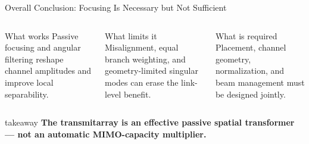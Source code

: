 \begin{frame}[t]{Overall Conclusion: Focusing Is Necessary but Not Sufficient}
\small
\begin{columns}[T,onlytextwidth]
  \begin{block}{What works}
    Passive focusing and angular filtering reshape channel amplitudes and
    improve local separability.
  \end{block}
  \begin{block}{What limits it}
    Misalignment, equal branch weighting, and geometry-limited singular modes
    can erase the link-level benefit.
  \end{block}
  \begin{block}{What is required}
    Placement, channel geometry, normalization, and beam management must be
    designed jointly.
  \end{block}
\end{columns}

\vspace{0.35cm}
\begin{beamercolorbox}[rounded=true,sep=1.0ex,wd=\linewidth]{takeaway}
  \centering\large\bfseries
  The transmitarray is an effective passive spatial transformer --- not an
  automatic MIMO-capacity multiplier.
\end{beamercolorbox}
\end{frame}


